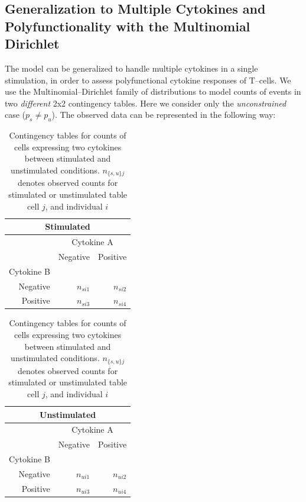 \documentclass[11pt]{article}
\begin{document}

\subsection*{Generalization to Multiple Cytokines and Polyfunctionality with the Multinomial Dirichlet}
The model can be generalized to handle multiple cytokines in a single stimulation, in order to assess polyfunctional cytokine responses of T--cells. We use the Multinomial--Dirichlet family of distributions to model counts of events in two \textit{different} 2x2 contingency tables. Here we consider only the \emph{unconstrained} case ($p_s\ne p_u$). The observed data can be represented in the following way: 

\begin{table}[ht]
\centering
\parbox{0.8\linewidth}{
\caption{Contingency tables for counts of cells expressing two cytokines between stimulated and unstimulated conditions. $n_{\{s,u\}j}$ denotes observed counts for stimulated or unstimulated table cell $j$, and individual $i$  }\label{tab:multdir}
\begin{minipage}[b]{0.5\linewidth}
\centering
\begin{tabular}{rrr}
\multicolumn{3}{c}{Stimulated}\\
  \hline
\multicolumn{1}{l}{}&
\multicolumn{2}{c}{Cytokine A}\\
 & Negative & Positive \\ 
 \multicolumn{1}{l}{Cytokine B}&&\\
  \hline
Negative &   $n_{si1}$ &   $n_{si2}$ \\ 
Positive &   $n_{si3}$ &   $n_{si4}$ \\ 
   \hline
\end{tabular}
\end{minipage}
\begin{minipage}[b]{0.5\linewidth}
\centering
\begin{tabular}{rrr}
\multicolumn{3}{c}{Unstimulated}\\
  \hline
\multicolumn{1}{l}{}&
\multicolumn{2}{c}{Cytokine A}\\
 & Negative & Positive \\ 
 \multicolumn{1}{l}{Cytokine B}&&\\
  \hline
Negative &   $n_{ui1}$ &   $n_{ui2}$ \\ 
Positive &   $n_{ui3}$ &   $n_{ui4}$ \\ 
   \hline
\end{tabular}
\end{minipage}
}
\end{table}
\end{document}
